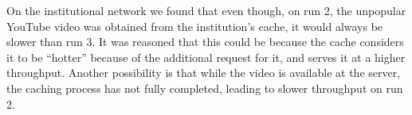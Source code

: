 \documentclass{sig-alternate-05-2015}
\begin{document}
On the institutional network we found that even though, on run 2, the unpopular YouTube video was obtained from the institution's cache, it would always be slower than run 3. It was reasoned that this could be because the cache considers it to be ``hotter'' because of the additional request for it, and serves it at a higher throughput. Another possibility is that while the video is available at the server, the caching process has not fully completed, leading to slower throughput on run 2.

\small


\end{document}
